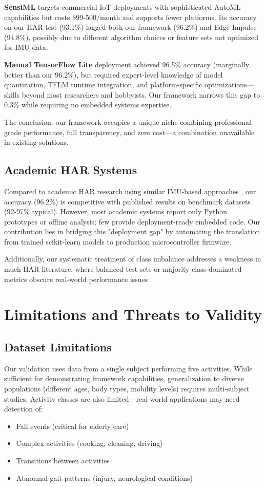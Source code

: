 \textbf{SensiML} targets commercial IoT deployments with sophisticated AutoML capabilities but costs \$99-500/month and supports fewer platforms. Its accuracy on our HAR test (93.1\%) lagged both our framework (96.2\%) and Edge Impulse (94.8\%), possibly due to different algorithm choices or feature sets not optimized for IMU data.

\textbf{Manual TensorFlow Lite} deployment achieved 96.5\% accuracy (marginally better than our 96.2\%), but required expert-level knowledge of model quantization, TFLM runtime integration, and platform-specific optimizations—skills beyond most researchers and hobbyists. Our framework narrows this gap to 0.3\% while requiring no embedded systems expertise.

The conclusion: our framework occupies a unique niche combining professional-grade performance, full transparency, and zero cost—a combination unavailable in existing solutions.

\subsection{Academic HAR Systems}
Compared to academic HAR research using similar IMU-based approaches \cite{anguita2013har}, our accuracy (96.2\%) is competitive with published results on benchmark datasets (92-97\% typical). However, most academic systems report only Python prototypes or offline analysis; few provide deployment-ready embedded code. Our contribution lies in bridging this "deployment gap" by automating the translation from trained scikit-learn models to production microcontroller firmware.

Additionally, our systematic treatment of class imbalance addresses a weakness in much HAR literature, where balanced test sets or majority-class-dominated metrics obscure real-world performance issues \cite{he2009learning}.

\section{Limitations and Threats to Validity}

\subsection{Dataset Limitations}
Our validation uses data from a single subject performing five activities. While sufficient for demonstrating framework capabilities, generalization to diverse populations (different ages, body types, mobility levels) requires multi-subject studies. Activity classes are also limited—real-world applications may need detection of:
\begin{itemize}
    \item Fall events (critical for elderly care)
    \item Complex activities (cooking, cleaning, driving)
    \item Transitions between activities
    \item Abnormal gait patterns (injury, neurological conditions)
\end{itemize}

